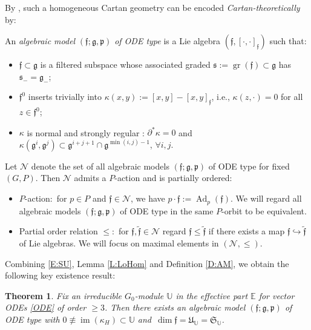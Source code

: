\documentclass[pdftex]{sigma}%
\DeclareMathOperator{\gr}{gr}
\DeclareMathOperator{\img}{im}
\newcommand\cN{\mathcal{N}}
\newcommand{\g}{\mathfrak{g}}
\newcommand\Ad{\operatorname{Ad}}
\renewcommand\gr{\operatorname{gr}}
\newcommand\ff{\mathfrak{f}}
\newcommand\fp{\mathfrak{p}}
\newcommand\fS{\mathfrak{S}}
\newcommand\fs{\mathfrak{s}}
\newcommand\fU{\mathfrak{U}}
\newcommand\bbE{\mathbb{E}}
\newcommand\bbU{\mathbb{U}}
\numberwithin{equation}{section}
\newtheorem{Theorem}{Theorem}[section]
\begin{document}
By \cite[Section~A.1]{KT2021}, such a homogeneous Cartan geometry can be encoded {\em Cartan-the\-o\-ret\-i\-cal\-ly} by:

\begin{Definition} \label{D:AM}
An {\em algebraic model} $(\ff;\g,\fp)$ {\em of ODE type} is a Lie algebra $(\ff,[\cdot,\cdot]_\ff)$ such that:
\begin{itemize}\itemsep=0pt
\item [(i)] $\ff \subset \g$ is a filtered subspace whose associated graded $\fs:=\gr(\ff) \subset \g$ has $\fs_- = \g_-$;
\item [(ii)] $\ff^0$ inserts trivially into $\kappa(x,y) := [x,y]-[x,y]_\ff$, i.e., $\kappa(z,\cdot) = 0$ for all $z \in \ff^0$;
\item [(iii)] $\kappa$ is normal and strongly regular : $\partial^\ast \kappa = 0$ and $\kappa(\g^i, \g^j) \subset \g^{i+j+1} \cap \g^{\min (i,j)-1}$, $\forall i,j$.
\end{itemize}
\end{Definition}

Let $\cN$ denote the set of all algebraic models $(\ff;\g,\fp )$ of ODE type for fixed $(G,P)$. Then $\cN$ admits a $P$-action and is partially ordered:
\begin{itemize}\itemsep=0pt
\item[(1)] $P$-action:\, for $p \in P$ and $ \ff \in \cN$, we have $p\cdot \ff := \Ad_{p}(\ff)$. We will regard all algebraic models $(\ff;\g,\fp)$ of ODE type in the same $P$-orbit to be equivalent.
\item[(2)] Partial order relation $\le$:\, for $\ff, \widetilde{\ff} \in \cN$ regard $\ff \le \widetilde{\ff}$ if there exists a map $\ff \hookrightarrow \widetilde{\ff}$ of Lie algebras. We will focus on maximal elements in $(\cN, \le)$.
\end{itemize}

Combining \eqref{E:SU}, Lemma \ref{L:LoHom} and Definition \ref{D:AM}, we obtain the following key existence result:

\begin{Theorem} \label{T:Existance}
Fix an irreducible $G_0$-module $\bbU$ in the effective part $\bbE$ for vector ODEs \eqref{ODE} of order $\ge 3$. Then there {\em exists} an algebraic model $(\ff;\g, \fp)$ of ODE type with $ 0 \not\equiv \img(\kappa_H) \subset \bbU$ and~$ \dim \ff = \fU_\bbU = \fS_\bbU$.
\end{Theorem}
\end{document}
